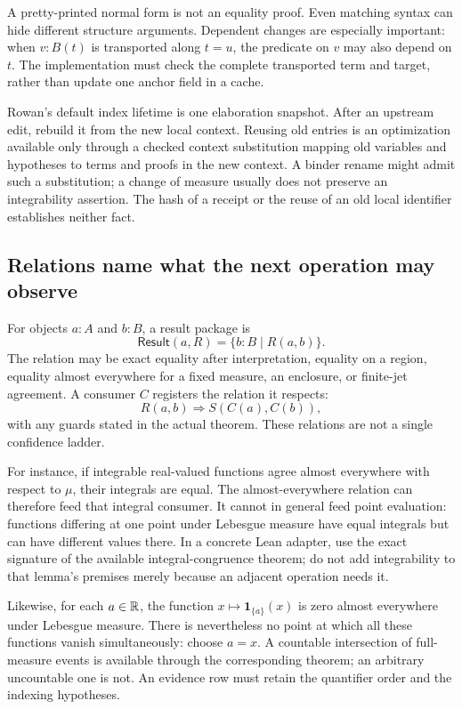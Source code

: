 \documentclass[11pt,letterpaper]{article}
\theoremstyle{definition}\newtheorem{definition}[theorem]{Definition}
\theoremstyle{remark}\newtheorem{remark}[theorem]{Remark}
\begin{document}
A pretty-printed normal form is not an equality proof. Even matching syntax
can hide different structure arguments. Dependent changes are especially
important: when $v:B(t)$ is transported along $t=u$, the predicate on $v$ may
also depend on $t$. The implementation must check the complete transported
term and target, rather than update one anchor field in a cache.

Rowan's default index lifetime is one elaboration snapshot. After an upstream
edit, rebuild it from the new local context. Reusing old entries is an
optimization available only through a checked context substitution mapping
old variables and hypotheses to terms and proofs in the new context. A binder
rename might admit such a substitution; a change of measure usually does
not preserve an integrability assertion. The hash of a receipt or the reuse
of an old local identifier establishes neither fact.

\subsection{Relations name what the next operation may observe}
For objects $a:A$ and $b:B$, a result package is
\[
 \mathsf{Result}(a,R)=\{b:B\mid R(a,b)\}.
\]
The relation may be exact equality after interpretation, equality on a region,
equality almost everywhere for a fixed measure, an enclosure, or finite-jet
agreement. A consumer $C$ registers the relation it respects:
\[
 R(a,b)\Longrightarrow S(C(a),C(b)),
\]
with any guards stated in the actual theorem. These relations are not a
single confidence ladder.

For instance, if integrable real-valued functions agree almost everywhere
with respect to $\mu$, their integrals are equal. The almost-everywhere
relation can therefore feed that integral consumer. It cannot in general feed
point evaluation: functions differing at one point under Lebesgue measure
have equal integrals but can have different values there. In a concrete Lean
adapter, use the exact signature of the available integral-congruence theorem;
do not add integrability to that lemma's premises merely because an adjacent
operation needs it.

Likewise, for each $a\in\mathbb R$, the function $x\mapsto\mathbf 1_{\{a\}}(x)$ is
zero almost everywhere under Lebesgue measure. There is nevertheless no
point at which all these functions vanish simultaneously: choose $a=x$.
A countable intersection of full-measure events is available through the
corresponding theorem; an arbitrary uncountable one is not. An evidence row
must retain the quantifier order and the indexing hypotheses.
\end{document}

